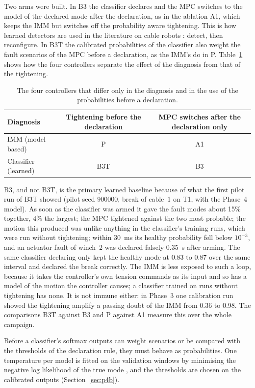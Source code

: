 \documentclass[10pt]{article}
\begin{document}
Two arms were built. In B3 the classifier declares and the MPC switches to the model of the declared mode after the declaration, as in the ablation A1, which keeps the IMM but switches off the probability aware tightening. This is how learned detectors are used in the literature on cable robots \citep{bettega2025load}: detect, then reconfigure. In B3T the calibrated probabilities of the classifier also weight the fault scenarios of the MPC before a declaration, as the IMM's do in P. Table~\ref{tab:2x2} shows how the four controllers separate the effect of the diagnosis from that of the tightening.

\begin{table}[h]
\centering\small
\caption{The four controllers that differ only in the diagnosis and in the use of the probabilities before a declaration.}\label{tab:2x2}
\begin{tabular}{@{}lcc@{}}
\toprule
Diagnosis & Tightening before the declaration & MPC switches after the declaration only \\
\midrule
IMM (model based) & P & A1 \\
Classifier (learned) & B3T & B3 \\
\bottomrule
\end{tabular}
\end{table}

B3, and not B3T, is the primary learned baseline because of what the first pilot run of B3T showed (pilot seed 900000, break of cable~1 on T1, with the Phase~4 model). As soon as the classifier was armed it gave the fault modes about 15\% together, 4\% the largest; the MPC tightened against the two most probable; the motion this produced was unlike anything in the classifier's training runs, which were run without tightening; within 30~ms its healthy probability fell below $10^{-3}$, and an actuator fault of winch~2 was declared falsely 0.35~s after arming. The same classifier declaring only kept the healthy mode at 0.83 to 0.87 over the same interval and declared the break correctly. The IMM is less exposed to such a loop, because it takes the controller's own tension commands as its input and so has a model of the motion the controller causes; a classifier trained on runs without tightening has none. It is not immune either: in Phase~3 one calibration run showed the tightening amplify a passing doubt of the IMM from 0.36 to 0.98. The comparisons B3T against B3 and P against A1 measure this over the whole campaign.

Before a classifier's softmax outputs can weight scenarios or be compared with the thresholds of the declaration rule, they must behave as probabilities. One temperature per model is fitted on the validation windows by minimising the negative log likelihood of the true mode \citep{guo2017calibration}, and the thresholds are chosen on the calibrated outputs (Section~\ref{sec:p4b}).
\end{document}
